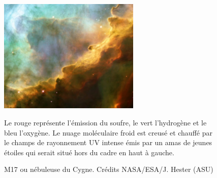 \documentclass[11pt,a4paper]{article}
\begin{document}
\begin{spacing}{0.98}
\begin{figure}[!p]
    \centering
    \includegraphics[trim = {0 0 0 0},clip, width=0.6\textwidth]{figure/omega.pdf}
    \vspace{1em}
    \caption{M17 ou nébuleuse du Cygne.
    Crédits NASA/ESA/J. Hester (ASU)}
    \vspace{1em}
    \begin{minipage}{\textwidth}
    Le rouge représente l'émission du soufre, le vert l'hydrogène et le bleu l'oxygène. Le nuage moléculaire froid est creusé et chauffé par le champs de rayonnement UV intense émis par un amas de jeunes étoiles qui serait situé hors du cadre en haut à gauche.
    \end{minipage} 
    \label{fig:m17}
\end{figure}{}



\end{spacing}
\end{document}
